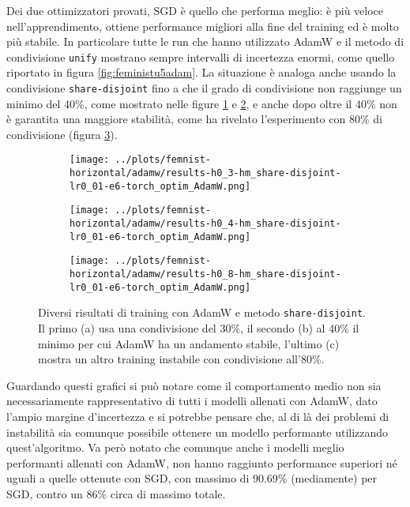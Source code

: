 Dei due ottimizzatori provati, SGD è quello che performa meglio: è più 
veloce nell'apprendimento, ottiene performance migliori alla fine del 
training ed è molto più stabile. In particolare tutte le run che hanno 
utilizzato AdamW e il metodo di condivisione \texttt{unify} mostrano 
sempre intervalli di incertezza enormi, come quello riportato in 
figura \ref{fig:feministu5adam}. La situazione è analoga anche usando 
la condivisione \texttt{share-disjoint} fino a che il grado di 
condivisione non raggiunge un minimo del 40\%, come mostrato nelle 
figure \ref{fig:feminists3adam} e \ref{fig:feminists4adam}, e anche 
dopo oltre il 40\% non è garantita una maggiore stabilità, come ha 
rivelato l'esperimento con 80\% di condivisione (figura \ref{fig:feminists8adam}).
\begin{figure}[htbp]  %
    \centering
    \begin{subfigure}[b]{0.49\textwidth}
        \centering
        \texttt{[image: ../plots/femnist-horizontal/adamw/results-h0\_3-hm\_share-disjoint-lr0\_01-e6-torch\_optim\_AdamW.png]}
        \caption{}
        \label{fig:feminists3adam}
    \end{subfigure}
    \hfill
    \begin{subfigure}[b]{0.49\textwidth}
        \centering
        \texttt{[image: ../plots/femnist-horizontal/adamw/results-h0\_4-hm\_share-disjoint-lr0\_01-e6-torch\_optim\_AdamW.png]}
        \caption{}
        \label{fig:feminists4adam}
    \end{subfigure}
    \centering
    \begin{subfigure}[b]{0.49\textwidth}
        \centering
        \texttt{[image: ../plots/femnist-horizontal/adamw/results-h0\_8-hm\_share-disjoint-lr0\_01-e6-torch\_optim\_AdamW.png]}
        \caption{}
        \label{fig:feminists8adam}
    \end{subfigure}
    
    \caption{
        Diversi risultati di training con AdamW e metodo \texttt{share-disjoint}.
        Il primo (a) usa una condivisione del 30\%, il secondo (b) al 40\%
        il minimo per cui AdamW ha un andamento stabile, l'ultimo (c) 
        mostra un altro training instabile con condivisione all'80\%.
    }
    \label{fig:femnistsxtm}
\end{figure}

Guardando questi grafici si può notare come il comportamento medio non sia 
necessariamente rappresentativo di tutti i modelli allenati con AdamW, dato 
l'ampio margine d'incertezza e si potrebbe pensare che, al di là dei problemi 
di instabilità sia comunque possibile ottenere un modello performante
utilizzando quest'algoritmo. Va però notato che comunque anche i modelli 
meglio performanti allenati con AdamW, non hanno raggiunto performance 
superiori né uguali a quelle ottenute con SGD, con massimo di 90.69\%
(mediamente) per SGD, contro un 86\% circa di massimo totale.

